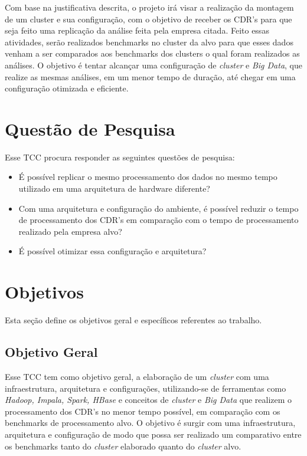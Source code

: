         Com base na justificativa descrita, o projeto irá visar a realização da montagem de um
        cluster e sua configuração, com o objetivo de receber os CDR’s para que seja feito uma
        replicação da análise feita pela empresa citada. Feito essas atividades, serão realizados
        benchmarks no cluster da alvo para que esses dados venham a ser comparados aos
        benchmarks dos clusters o qual foram realizados as análises. O objetivo é tentar alcançar
        uma configuração de \textit{cluster} e \textit{Big Data}, que realize as mesmas análises,
        em um menor tempo de duração, até chegar em uma configuração otimizada e eficiente.

    \section{Questão de Pesquisa}

        Esse TCC procura responder as seguintes questões de pesquisa:

        \begin{itemize}
            \item É possível replicar o mesmo processamento dos dados no mesmo tempo utilizado em uma arquitetura
                      de hardware diferente?
            \item Com uma arquitetura e configuração do ambiente, é possível reduzir o tempo de processamento
                      dos CDR's em comparação com o tempo de processamento realizado pela empresa alvo?
            \item É possível otimizar essa configuração e arquitetura?
        \end{itemize}

    \section{Objetivos}

        Esta seção define os objetivos geral e específicos referentes ao trabalho.

        \subsection{Objetivo Geral}

            Esse TCC tem como objetivo geral, a elaboração de um \textit{cluster} com uma infraestrutura, arquitetura
            e configurações, utilizando-se de ferramentas como \textit{Hadoop, Impala, Spark, HBase} e conceitos de
            \textit{cluster} e \textit{Big Data} que realizem o processamento dos CDR's no menor tempo possível, em
            comparação com os benchmarks de processamento alvo. O objetivo é surgir com uma infraestrutura,
            arquitetura e configuração de modo que possa ser realizado um comparativo entre os benchmarks tanto
            do \textit{cluster} elaborado quanto do \textit{cluster} alvo.

